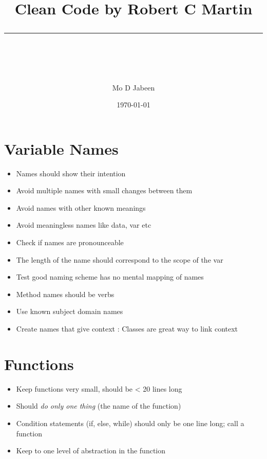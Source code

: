 \documentclass[11pt]{scrartcl} %
\title{	
	\normalfont\normalsize
	\vspace{20pt} %
	{\huge Clean Code by Robert C Martin}\\ %
	\vspace{12pt} %
	\rule{\linewidth}{2pt}\\ %
	
	\author{\small Mo D Jabeen} %
	
	\date{\normalsize\today} %
	
}
\begin{document}
	\maketitle %
	
	\section{Variable Names}

	\begin{itemize}
		\item Names should show their intention
		\item Avoid multiple names with small changes between them
		\item Avoid names with other known meanings
		\item Avoid meaningless names like data, var etc
		\item Check if names are pronounceable
		\item The length of the name should correspond to the scope of the var
		
		\item Test good naming scheme has no mental mapping of names
		\item Method names should be verbs
		\item Use known subject domain names
		\item Create names that give context : Classes are great way to link context
	\end{itemize}

\section{Functions}

	\begin{itemize}

		\item Keep functions very small, should be < 20 lines long
		\item Should \textit{do only one thing} (the name of the function)
		\item Condition statements (if, else, while) should only be one line long; call a function
		\item Keep to one level of abstraction in the function
	\end{itemize}
\end{document}

